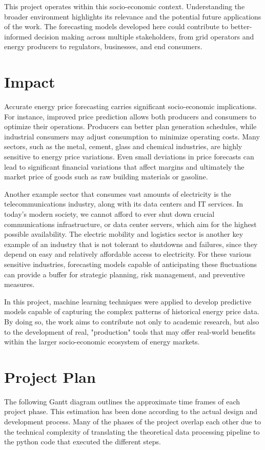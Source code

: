 \documentclass[12pt]{report} %
\begin{document}
This project operates within this socio-economic context. Understanding the broader environment highlights its relevance and the potential future applications of the work. The forecasting models developed here could contribute to better-informed decision making across multiple stakeholders, from grid operators and energy producers to regulators, businesses, and end consumers.


\section{Impact}

Accurate energy price forecasting carries significant socio-economic implications. For instance, improved price prediction allows both producers and consumers to optimize their operations. Producers can better plan generation schedules, while industrial consumers may adjust consumption to minimize operating costs. Many sectors, such as the metal, cement, glass and chemical industries, are highly sensitive to energy price variations. Even small deviations in price forecasts can lead to significant financial variations that affect margins and ultimately the market price of goods such as raw building materials or gasoline.

Another example sector that consumes vast amounts of electricity is the telecommunications industry, along with its data centers and IT services. In today's modern society, we cannot afford to ever shut down crucial communications infrastructure, or data center servers, which aim for the highest possible availability.
The electric mobility and logistics sector is another key example of an industry that is not tolerant to shutdowns and failures, since they depend on easy and relatively affordable access to electricity. For these various sensitive industries, forecasting models capable of anticipating these fluctuations can provide a buffer for strategic planning, risk management, and preventive measures.

In this project, machine learning techniques were applied to develop predictive models capable of capturing the complex patterns of historical energy price data. By doing so, the work aims to contribute not only to academic research, but also to the development of real, "production" tools that may offer real-world benefits within the larger socio-economic ecosystem of energy markets.


\section{Project Plan}
The following Gantt diagram outlines the approximate time frames of each project phase. This estimation has been done according to the actual design and development process. Many of the phases of the project overlap each other due to the technical complexity of translating the theoretical data processing pipeline to the python code that executed the different steps.
\end{document}
